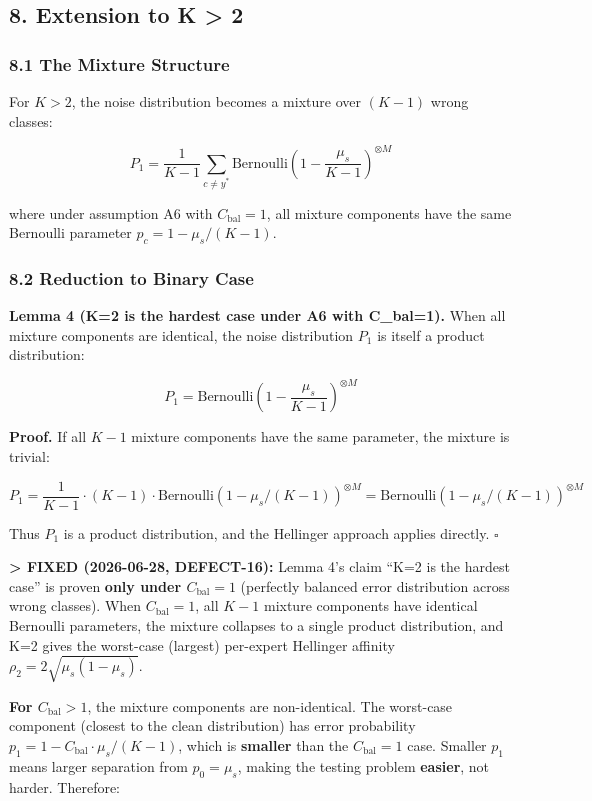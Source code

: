 \documentclass[
  12pt,
]{article}
\begin{document}
\subsection{8. Extension to K \textgreater{} 2}\label{extension-to-k-2}

\subsubsection{8.1 The Mixture Structure}\label{the-mixture-structure}

For \(K > 2\), the noise distribution becomes a mixture over \((K-1)\)
wrong classes:

\[P_1 = \frac{1}{K-1} \sum_{c \neq y^*} \text{Bernoulli}\!\left(1 - \frac{\mu_s}{K-1}\right)^{\otimes M}\]

where under assumption A6 with \(C_{\text{bal}} = 1\), all mixture
components have the same Bernoulli parameter \(p_c = 1 - \mu_s/(K-1)\).

\subsubsection{8.2 Reduction to Binary
Case}\label{reduction-to-binary-case}

\textbf{Lemma 4 (K=2 is the hardest case under A6 with C\_bal=1).} When
all mixture components are identical, the noise distribution \(P_1\) is
itself a product distribution:

\[P_1 = \text{Bernoulli}\!\left(1 - \frac{\mu_s}{K-1}\right)^{\otimes M}\]

\textbf{Proof.} If all \(K-1\) mixture components have the same
parameter, the mixture is trivial:

\[P_1 = \frac{1}{K-1} \cdot (K-1) \cdot \text{Bernoulli}(1 - \mu_s/(K-1))^{\otimes M}
= \text{Bernoulli}(1 - \mu_s/(K-1))^{\otimes M}\]

Thus \(P_1\) is a product distribution, and the Hellinger approach
applies directly. \(\square\)

\textbf{\textgreater{} FIXED (2026-06-28, DEFECT-16):} Lemma 4's claim
``K=2 is the hardest case'' is proven \textbf{only under
\(C_{\text{bal}} = 1\)} (perfectly balanced error distribution across
wrong classes). When \(C_{\text{bal}} = 1\), all \(K-1\) mixture
components have identical Bernoulli parameters, the mixture collapses to
a single product distribution, and K=2 gives the worst-case (largest)
per-expert Hellinger affinity \(\rho_2 = 2\sqrt{\mu_s(1-\mu_s)}\).

\textbf{For \(C_{\text{bal}} > 1\)}, the mixture components are
non-identical. The worst-case component (closest to the clean
distribution) has error probability
\(p_1 = 1 - C_{\text{bal}} \cdot \mu_s/(K-1)\), which is
\textbf{smaller} than the \(C_{\text{bal}}=1\) case. Smaller \(p_1\)
means larger separation from \(p_0 = \mu_s\), making the testing problem
\textbf{easier}, not harder. Therefore:
\end{document}
